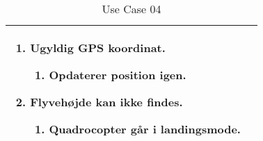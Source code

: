 \begin{table}[H]
\begin{tabular}{|l|p{10cm}|}
									\renewcommand{\labelenumi}{\Roman{enumi}:}
									\renewcommand{\labelenumii}{\alph{enumii})}
									\begin{enumerate}[topsep=0.0cm,leftmargin=0.5cm]
										\item Ugyldig GPS koordinat.
											\begin{enumerate}[topsep=0cm, leftmargin=1cm]
												\item Opdaterer position igen.
											\end{enumerate}
										\item Flyvehøjde kan ikke findes.
											\begin{enumerate}[topsep=0cm, leftmargin=1cm]
												\item Quadrocopter går i landingsmode.
											\end{enumerate}
									\end{enumerate} \\\hline	

\end{tabular}
\caption{Use Case 04}
\label{tab:UC04}
\end{table}